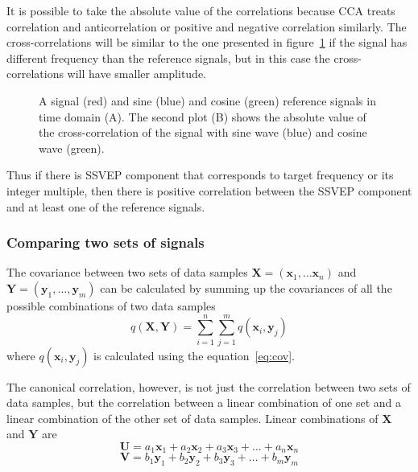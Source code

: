 It is possible to take the absolute value of the \glspl{correlation} because \gls{CCA} treats \gls{correlation} and anticorrelation or positive and negative \gls{correlation} similarly. The \glspl{cross-correlation} will be similar to the one presented in figure~\ref{fig:cross_corr} if the signal has different frequency than the \glspl{reference signal}, but in this case the \glspl{cross-correlation} will have smaller amplitude.

\begin{figure}[h!]
	
	\caption{A signal (red) and sine (blue) and cosine (green) reference signals in time domain (A). The second plot (B) shows the absolute value of the cross-correlation of the signal with sine wave (blue) and cosine wave (green).}
	\label{fig:cross_corr}
\end{figure}

Thus if there is \gls{SSVEP} component that corresponds to \gls{target} frequency or its integer multiple, then there is positive \gls{correlation} between the \gls{SSVEP} component and at least one of the \glspl{reference signal}.

\subsubsection{Comparing two sets of signals}

The \gls{covariance} between two sets of data \glspl{sample} $\mathbf{X}=(\mathbf{x}_1,\dots\mathbf{x}_n)$ and $\mathbf{Y}=(\mathbf{y}_1,\dots,\mathbf{y}_m)$ can be calculated by summing up the \glspl{covariance} of all the possible combinations of two data \glspl{sample}
\begin{equation}
	q(\mathbf{X}, \mathbf{Y}) = \sum_{i=1}^{n}\sum_{j=1}^{m}q(\mathbf{x}_i, \mathbf{y}_j)
\end{equation}
where $q(\mathbf{x}_i, \mathbf{y}_j)$ is calculated using the equation~\ref{eq:cov}.

The \gls{canonical correlation}, however, is not just the \gls{correlation} between two sets of data \glspl{sample}, but the \gls{correlation} between a \gls{linear combination} of one set and a \gls{linear combination} of the other set of data \glspl{sample}. Linear combinations of $\mathbf{X}$ and $\mathbf{Y}$ are
\begin{equation*}
	\mathbf{U} = a_1\mathbf{x}_1 + a_2\mathbf{x}_2 + a_3\mathbf{x}_3 + \dots + a_n\mathbf{x}_n
\end{equation*}
\begin{equation*}
	\mathbf{V} = b_1\mathbf{y}_1 + b_2\mathbf{y}_2 + b_3\mathbf{y}_3 + \dots + b_m\mathbf{y}_m
\end{equation*}

